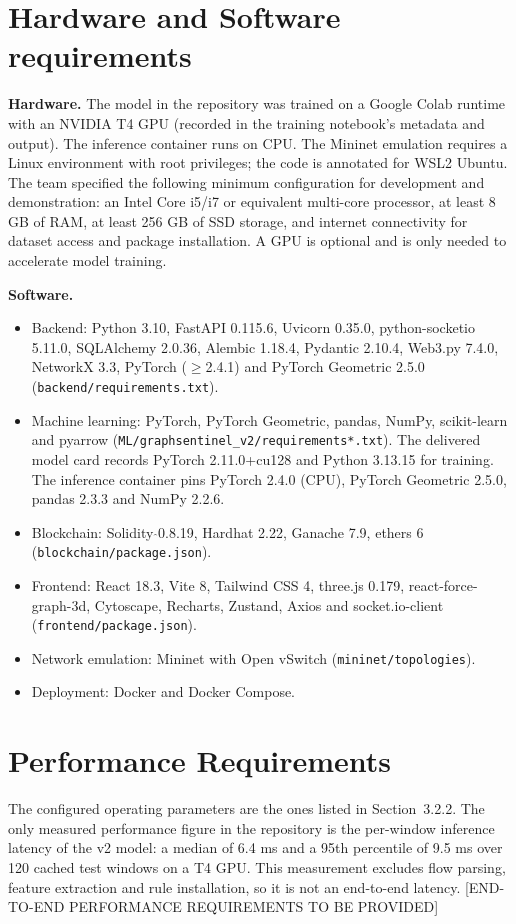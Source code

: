 \documentclass[12pt,a4paper]{report}
\begin{document}
\section{Hardware and Software requirements}
\par \textbf{Hardware.} The model in the repository was trained on a Google Colab runtime with an NVIDIA T4 GPU (recorded in the training notebook's metadata and output). The inference container runs on CPU. The Mininet emulation requires a Linux environment with root privileges; the code is annotated for WSL2 Ubuntu. The team specified the following minimum configuration for development and demonstration: an Intel Core i5/i7 or equivalent multi-core processor, at least 8 GB of RAM, at least 256 GB of SSD storage, and internet connectivity for dataset access and package installation. A GPU is optional and is only needed to accelerate model training.
\par \textbf{Software.}
\begin{itemize}
    \item Backend: Python 3.10, FastAPI 0.115.6, Uvicorn 0.35.0, python-socketio 5.11.0, SQLAlchemy 2.0.36, Alembic 1.18.4, Pydantic 2.10.4, Web3.py 7.4.0, NetworkX 3.3, PyTorch ($\geq$2.4.1) and PyTorch Geometric 2.5.0 (\texttt{backend/\allowbreak{}requirements.txt}).
    \item Machine learning: PyTorch, PyTorch Geometric, pandas, NumPy, scikit-learn and pyarrow (\texttt{ML/\allowbreak{}graphsentinel\_\allowbreak{}v2/\allowbreak{}requirements*.\allowbreak{}txt}). The delivered model card records PyTorch 2.11.0+cu128 and Python 3.13.15 for training. The inference container pins PyTorch 2.4.0 (CPU), PyTorch Geometric 2.5.0, pandas 2.3.3 and NumPy 2.2.6.
    \item Blockchain: Solidity $\hat{}$0.8.19, Hardhat 2.22, Ganache 7.9, ethers 6 (\texttt{blockchain/\allowbreak{}package.json}).
    \item Frontend: React 18.3, Vite 8, Tailwind CSS 4, three.js 0.179, react-force-graph-3d, Cytoscape, Recharts, Zustand, Axios and socket.io-client (\texttt{frontend/\allowbreak{}package.json}).
    \item Network emulation: Mininet with Open vSwitch (\texttt{mininet/\allowbreak{}topologies}).
    \item Deployment: Docker and Docker Compose.
\end{itemize}

\section{Performance Requirements}
\par The configured operating parameters are the ones listed in Section~3.2.2. The only measured performance figure in the repository is the per-window inference latency of the v2 model: a median of 6.4 ms and a 95th percentile of 9.5 ms over 120 cached test windows on a T4 GPU. This measurement excludes flow parsing, feature extraction and rule installation, so it is not an end-to-end latency. [END-TO-END PERFORMANCE REQUIREMENTS TO BE PROVIDED]
\end{document}
